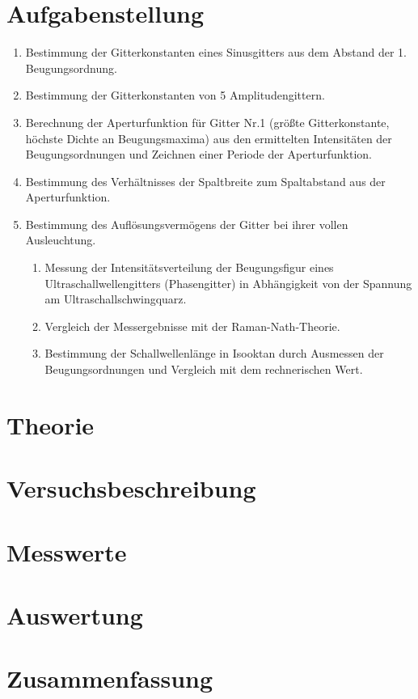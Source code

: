 \section{Aufgabenstellung}
\begin{enumerate}
 \item Bestimmung der Gitterkonstanten eines Sinusgitters aus dem Abstand der 1. Beugungsordnung.
\item Bestimmung der Gitterkonstanten von 5 Amplitudengittern.
\item Berechnung der Aperturfunktion für Gitter Nr.1 (größte Gitterkonstante,
      höchste Dichte an Beugungsmaxima) aus den ermittelten Intensitäten der
      Beugungsordnungen und Zeichnen einer Periode der Aperturfunktion.
\item Bestimmung des Verhältnisses der Spaltbreite zum Spaltabstand aus der
      Aperturfunktion.
\item Bestimmung des Auflösungsvermögens der Gitter bei ihrer vollen Ausleuchtung.

  \begin{enumerate}
    \item Messung der Intensitätsverteilung der Beugungsfigur eines Ultraschallwellengitters (Phasengitter)
	in Abhängigkeit von der Spannung am Ultraschallschwingquarz.
    \item Vergleich der Messergebnisse mit der Raman-Nath-Theorie.
    \item Bestimmung der Schallwellenlänge in Isooktan durch Ausmessen der Beugungsordnungen und Vergleich mit dem rechnerischen Wert.
  \end{enumerate}
\end{enumerate}

\section{Theorie}

\section{Versuchsbeschreibung}

\section{Messwerte}

\section{Auswertung}

\section{Zusammenfassung}
